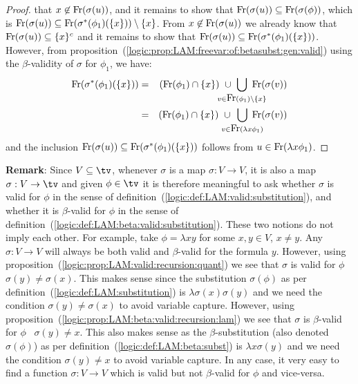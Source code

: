 \begin{proof}
    that $x\not\in\mbox{\rm Fr}(\sigma(u))$, and it remains to show that 
    $\mbox{\rm Fr}(\sigma(u))\subseteq\mbox{\rm Fr}(\sigma(\phi))$, which is
    $\mbox{\rm Fr}(\sigma(u))\subseteq\mbox{\rm Fr}(\sigma^{*}(\phi_{1})(\{x\}))\setminus\{x\}$.
    From $x\not\in\mbox{\rm Fr}(\sigma(u))$ we already know that 
    $\mbox{\rm Fr}(\sigma(u))\subseteq\{x\}^{c}$ and it remains to show that
    $\mbox{\rm Fr}(\sigma(u))\subseteq\mbox{\rm Fr}(\sigma^{*}(\phi_{1})(\{x\}))$. However, from 
    proposition~(\ref{logic:prop:LAM:freevar:of:betasubst:gen:valid}) using the 
    $\beta$-validity of $\sigma$ for $\phi_{1}$, we have:
    \begin{eqnarray*}
        \free(\sigma^{*}(\phi_{1})(\{x\}))
        &=&(\free(\phi_{1})\cap\{x\})
        \ \cup\ 
        \!\!\!\!\!\!\!\!\!\!\!\!
        \bigcup_{v\in\free(\phi_{1})\setminus\{x\}} 
        \!\!\!\!\!\!\!\!\!\!
        \free(\sigma(v))\\
        &=&(\free(\phi_{1})\cap\{x\})
        \ \cup\ 
        \!\!\!\!\!\!\!\!\!
        \bigcup_{v\in\free(\lambda x\phi_{1})} 
        \!\!\!\!\!\!\!\!
        \free(\sigma(v))
    \end{eqnarray*}
    and the inclusion 
    $\mbox{\rm Fr}(\sigma(u))\subseteq\mbox{\rm Fr}(\sigma^{*}(\phi_{1})(\{x\}))$
    follows from $u\in\mbox{\rm Fr}(\lambda x\phi_{1})$.
\end{proof}
{\bf Remark}: Since $V\subseteq\tv$, whenever $\sigma$ is a map 
$\sigma:V\to V$, it is also a map $\sigma:V\to\tv$ and given $\phi\in\tv$
it is therefore meaningful to ask whether $\sigma$ is valid for $\phi$ 
in the sense of definition~(\ref{logic:def:LAM:valid:substitution}), 
and whether it is $\beta$-valid for $\phi$ in the sense of 
definition~(\ref{logic:def:LAM:beta:valid:substitution}). These two
notions do not imply each other. For example, take $\phi=\lambda x y$
for some $x,y\in V$, $x\neq y$. Any $\sigma:V\to V$ will always be
both valid and $\beta$-valid for the formula $y$. However, using
proposition~(\ref{logic:prop:LAM:valid:recursion:quant}) we see that
$\sigma$ is valid for $\phi$ \ifand\ $\sigma(y)\neq\sigma(x)$. This makes
sense since the substitution $\sigma(\phi)$ as per 
definition~(\ref{logic:def:LAM:substitution}) is $\lambda\sigma(x)\sigma(y)$
and we need the condition $\sigma(y)\neq\sigma(x)$ to avoid variable
capture. However, using 
proposition~(\ref{logic:prop:LAM:beta:valid:recursion:lam}) we see that 
$\sigma$ is $\beta$-valid for $\phi$ \ifand\ $\sigma(y)\neq x$.
This also makes sense as the $\beta$-substitution (also denoted $\sigma(\phi)$)
as per definition~(\ref{logic:def:LAM:beta:subst}) is $\lambda x \sigma(y)$
and we need the condition $\sigma(y)\neq x$ to avoid variable capture. In any
case, it very easy to find a function $\sigma:V\to V$ which is valid but not 
$\beta$-valid for $\phi$ and vice-versa.

